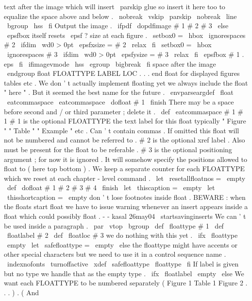 {{text
after
the
image
which
will
insert
%
\
parskip
glue
so
insert
it
here
too
to
equalize
the
space
%
above
and
below
.
\
nobreak
\
vskip
\
parskip
\
nobreak
\
line
\
bgroup
\
hss
\
fi
%
%
Output
the
image
.
\
ifpdf
\
dopdfimage
{
#
1
}
{
#
2
}
{
#
3
}
%
\
else
%
\
epsfbox
itself
resets
\
epsf
?
size
at
each
figure
.
\
setbox0
=
\
hbox
{
\
ignorespaces
#
2
}
\
ifdim
\
wd0
>
0pt
\
epsfxsize
=
#
2
\
relax
\
fi
\
setbox0
=
\
hbox
{
\
ignorespaces
#
3
}
\
ifdim
\
wd0
>
0pt
\
epsfysize
=
#
3
\
relax
\
fi
\
epsfbox
{
#
1
.
eps
}
%
\
fi
%
\
ifimagevmode
\
hss
\
egroup
\
bigbreak
\
fi
%
space
after
the
image
\
endgroup
}
%
float
FLOATTYPE
LABEL
LOC
.
.
.
end
float
for
displayed
figures
tables
%
etc
.
We
don
'
t
actually
implement
floating
yet
we
always
include
the
%
float
"
here
"
.
But
it
seemed
the
best
name
for
the
future
.
%
\
envparseargdef
\
float
{
\
eatcommaspace
\
eatcommaspace
\
dofloat
#
1
\
finish
}
%
There
may
be
a
space
before
second
and
/
or
third
parameter
;
delete
it
.
\
def
\
eatcommaspace
#
1
{
#
1
}
%
#
1
is
the
optional
FLOATTYPE
the
text
label
for
this
float
typically
%
"
Figure
"
"
Table
"
"
Example
"
etc
.
Can
'
t
contain
commas
.
If
omitted
%
this
float
will
not
be
numbered
and
cannot
be
referred
to
.
%
%
#
2
is
the
optional
xref
label
.
Also
must
be
present
for
the
float
to
%
be
referable
.
%
%
#
3
is
the
optional
positioning
argument
;
for
now
it
is
ignored
.
It
%
will
somehow
specify
the
positions
allowed
to
float
to
(
here
top
bottom
)
.
%
%
We
keep
a
separate
counter
for
each
FLOATTYPE
which
we
reset
at
each
%
chapter
-
level
command
.
\
let
\
resetallfloatnos
=
\
empty
%
\
def
\
dofloat
#
1
#
2
#
3
#
4
\
finish
{
%
\
let
\
thiscaption
=
\
empty
\
let
\
thisshortcaption
=
\
empty
%
%
don
'
t
lose
footnotes
inside
float
.
%
%
BEWARE
:
when
the
floats
start
float
we
have
to
issue
warning
whenever
an
%
insert
appears
inside
a
float
which
could
possibly
float
.
-
-
kasal
26may04
%
\
startsavinginserts
%
%
We
can
'
t
be
used
inside
a
paragraph
.
\
par
%
\
vtop
\
bgroup
\
def
\
floattype
{
#
1
}
%
\
def
\
floatlabel
{
#
2
}
%
\
def
\
floatloc
{
#
3
}
%
we
do
nothing
with
this
yet
.
%
\
ifx
\
floattype
\
empty
\
let
\
safefloattype
=
\
empty
\
else
{
%
%
the
floattype
might
have
accents
or
other
special
characters
%
but
we
need
to
use
it
in
a
control
sequence
name
.
\
indexnofonts
\
turnoffactive
\
xdef
\
safefloattype
{
\
floattype
}
%
}
%
\
fi
%
%
If
label
is
given
but
no
type
we
handle
that
as
the
empty
type
.
\
ifx
\
floatlabel
\
empty
\
else
%
We
want
each
FLOATTYPE
to
be
numbered
separately
(
Figure
1
%
Table
1
Figure
2
.
.
.
)
.
(
And
}}
